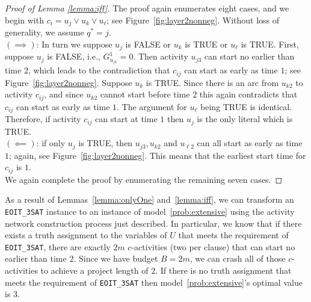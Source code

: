 \documentclass[11pt]{article}
\newcommand{\noi}{\noindent}
\newcommand{\tcr}{\textcolor{red}}
\newcommand{\tcb}{\textcolor{blue}}
\begin{document}
	\begin{proof}[Proof of Lemma \ref{lemma:iff}]
		The proof again enumerates eight cases, and we begin with $c_i=u_j \vee u_k \vee u_\ell$; see Figure~\ref{fig:layer2nonneg}. Without loss of generality, we assume \(q^* = j\).\\
		\((\implies)\): In turn we suppose $u_j$ is FALSE or $u_k$ is TRUE or $u_\ell$ is TRUE. 
		First, suppose \(u_j\) is FALSE, i.e., $G_{u_{j1}}^1=0$. Then activity \(u_{j3}\) can start no earlier than time \(2\), which leads to the contradiction that \(c_{ij}\) can start as early as time \(1\); see Figure~\ref{fig:layer2nonneg}. Suppose \(u_k\) is TRUE. 
		Since there is an arc from \(u_{k2}\) to activity \(c_{ij}\), and since \(u_{k2}\) cannot start before time \(2\) this again contradicts that \(c_{ij}\) can start as early as time \(1\). The argument for $u_\ell$ being TRUE is identical. Therefore, if activity \(c_{ij}\) can start at time \(1\) then \(u_j\) is the only literal which is TRUE.\\
		\((\impliedby)\): if only \(u_j\) is TRUE, then \(u_{j3}, u_{k2}\) and \(u_{\ell 2}\) can all start as early as time \(1\); again, see Figure~\ref{fig:layer2nonneg}. This means that the earliest start time for \(c_{ij}\) is \(1\). \\
		We again complete the proof by enumerating the remaining seven cases. 
	\end{proof}
	\noi As a result of Lemmas~\ref{lemma:onlyOne} and~\ref{lemma:iff},  we can transform an \verb|EOIT_3SAT| instance to an instance of model~\eqref{prob:extensive} using the activity network construction process just described. In particular, we know that if there exists a truth assignment to the variables of $U$ that meets the requirement of \verb|EOIT_3SAT|, there are exactly $2m$  \(c\)-activities (two per clause) that can start no earlier than time \(2\). Since we have budget \(B = 2m\), we can crash all of those \(c\)-activities to achieve a project length of \(2\). If there is no truth assignment that meets the requirement of \verb|EOIT_3SAT| then model~\eqref{prob:extensive}'s optimal value is $3$. 
\end{document}
